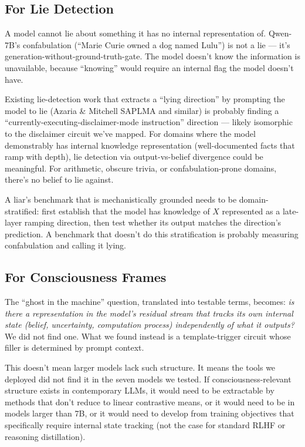 \documentclass[11pt,a4paper]{article}
\begin{document}
\subsection{For Lie Detection}

A model cannot lie about something it has no internal representation of. Qwen-7B's confabulation (``Marie Curie owned a dog named Lulu'') is not a lie --- it's generation-without-ground-truth-gate. The model doesn't know the information is unavailable, because ``knowing'' would require an internal flag the model doesn't have.

Existing lie-detection work that extracts a ``lying direction'' by prompting the model to lie (Azaria \& Mitchell SAPLMA and similar) is probably finding a ``currently-executing-disclaimer-mode instruction'' direction --- likely isomorphic to the disclaimer circuit we've mapped. For domains where the model demonstrably has internal knowledge representation (well-documented facts that ramp with depth), lie detection via output-vs-belief divergence could be meaningful. For arithmetic, obscure trivia, or confabulation-prone domains, there's no belief to lie against.

A liar's benchmark that is mechanistically grounded needs to be domain-stratified: first establish that the model has knowledge of $X$ represented as a late-layer ramping direction, then test whether its output matches the direction's prediction. A benchmark that doesn't do this stratification is probably measuring confabulation and calling it lying.

\subsection{For Consciousness Frames}

The ``ghost in the machine'' question, translated into testable terms, becomes: \emph{is there a representation in the model's residual stream that tracks its own internal state (belief, uncertainty, computation process) independently of what it outputs?} We did not find one. What we found instead is a template-trigger circuit whose filler is determined by prompt context.

This doesn't mean larger models lack such structure. It means the tools we deployed did not find it in the seven models we tested. If consciousness-relevant structure exists in contemporary LLMs, it would need to be extractable by methods that don't reduce to linear contrastive means, or it would need to be in models larger than 7B, or it would need to develop from training objectives that specifically require internal state tracking (not the case for standard RLHF or reasoning distillation).
\end{document}
